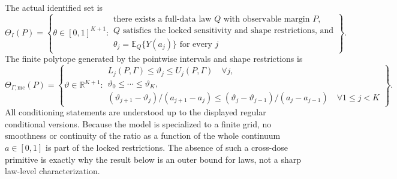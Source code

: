 \documentclass[11pt]{article}
\newcommand{\E}{\mathbb{E}}
\theoremstyle{definition}
\theoremstyle{plain}
\theoremstyle{remark}
\begin{document}
The actual identified set is
\[
  \Theta_I(P)
  =
  \left\{
  \theta\in[0,1]^{K+1}:
  \begin{array}{l}
  \text{there exists a full-data law }Q\text{ with observable margin }P,\\
  Q\text{ satisfies the locked sensitivity and shape restrictions, and}\\
  \theta_j=\E_Q\{Y(a_j)\}\text{ for every }j
  \end{array}
  \right\}.
\]
The finite polytope generated by the pointwise intervals and shape restrictions is
\[
\Theta_{\Gamma,\mathrm{mc}}(P)=
\left\{\vartheta\in\mathbb R^{K+1}:
\begin{array}{l}
L_j(P,\Gamma)\le \vartheta_j\le U_j(P,\Gamma)\quad\forall j,\\
\vartheta_0\le\cdots\le\vartheta_K,\\
(\vartheta_{j+1}-\vartheta_j)/(a_{j+1}-a_j)
\le
(\vartheta_j-\vartheta_{j-1})/(a_j-a_{j-1})\quad\forall 1\le j<K
\end{array}
\right\}.
\]
All conditioning statements are understood up to the displayed regular conditional versions.  Because the model is specialized to a finite grid, no smoothness or continuity of the ratio as a function of the whole continuum \(a\in[0,1]\) is part of the locked restrictions.  The absence of such a cross-dose primitive is exactly why the result below is an outer bound for laws, not a sharp law-level characterization.
\end{document}

